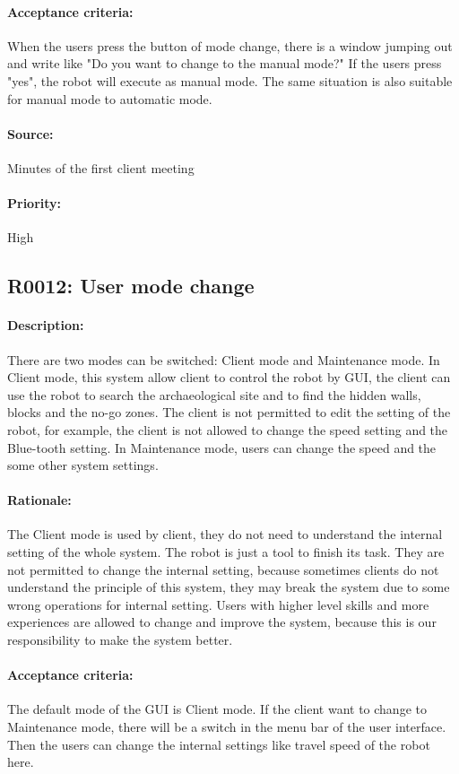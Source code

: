 \documentclass[11pt, a4paper]{report}
\begin{document}
\paragraph{Acceptance criteria:}
When the users press the button of mode change, there is a window jumping out and write like "Do you want to change to the manual mode?" If the users press "yes", the robot will execute as manual mode. The same situation is also suitable for manual mode to automatic mode.
\paragraph{Source:}
 Minutes of the first client meeting 
\paragraph{Priority:}
High 


\subsection{R0012: User mode change}
\paragraph{Description:}
There are two modes can be switched: Client mode and Maintenance mode. In Client mode, this system allow client to control the robot by GUI, the client can use the robot to search the archaeological site and to find the hidden walls, blocks and the no-go zones. The client is not permitted to edit the setting of the robot, for example, the client is not allowed to change the speed setting and the Blue-tooth setting. In Maintenance mode, users can change the speed and the some other system settings.
\paragraph{Rationale:}
The Client mode is used by client, they do not need to understand the internal setting of the whole system. The robot is just a tool to finish its task. They are not permitted to change the internal setting, because sometimes clients do not understand the principle of this system, they may break the system due to some wrong operations for internal setting. Users with higher level skills and more experiences are allowed to change and improve the system, because this is our responsibility to make the system better.
\paragraph{Acceptance criteria:}
The default mode of the GUI is Client mode. If the client want to change to Maintenance mode, there will be a switch in the menu bar of the user interface. Then the users can change the internal settings like travel speed of the robot here.
\end{document}

